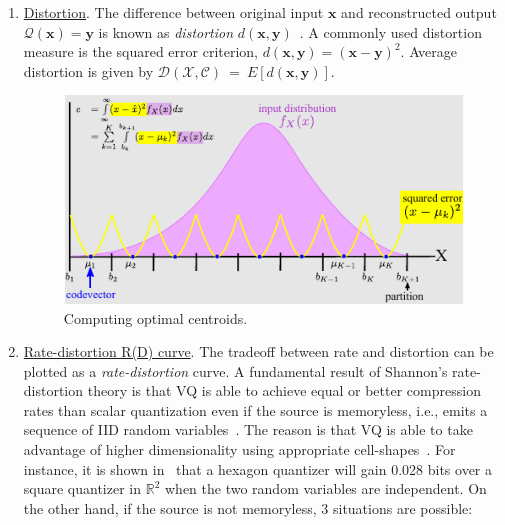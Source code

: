 \begin{Body}
\begin{enumerate}
\item \underline{Distortion}.  The difference between original input $\mathbf{x}$ and reconstructed output $\mathcal{Q}(\mathbf{x})=\mathbf{y}$ is known as \emph{distortion} $d(\mathbf{x}, \mathbf{y})$~\cite{2005_BOOK_DataCompression_Sayood}.  A commonly used distortion measure is the squared error criterion, $d(\mathbf{x}, \mathbf{y})=(\mathbf{x}-\mathbf{y})^2$.  Average distortion is given by $\mathcal{D(\mathcal{X}, \mathcal{C})}~=~E\left[d(\mathbf{x}, \mathbf{y}) \right]$.  




								\begin{figure}[t]			
								\includegraphics[width=1\textwidth]{thesis/Quantization_MSE.pdf}
								\caption{Computing optimal centroids.}
								\label{fig:computing_optimal_centroids}	
								\end{figure}




\item \underline{Rate-distortion R(D) curve}.  The tradeoff between rate and distortion can be plotted as a \emph{rate-distortion} curve.  A fundamental result of Shannon's rate-distortion theory is that VQ is able to achieve equal or better compression rates than scalar quantization even if the source is memoryless, i.e., emits a sequence of IID random variables~\cite{1984_JNL_VQ_Gray}.   The reason is that VQ is able to take advantage of higher dimensionality using appropriate cell-shapes~\cite{1985_JNL_VQ_Makhoul}.  For instance, it is shown in~\cite{1985_JNL_VQ_Makhoul} that a hexagon quantizer will gain 0.028 bits over a square quantizer in $\mathbb{R}^2$ when the two random variables are independent.  On the other hand, if the source is not memoryless, 3 situations are possible:


\end{enumerate}
\end{Body}
